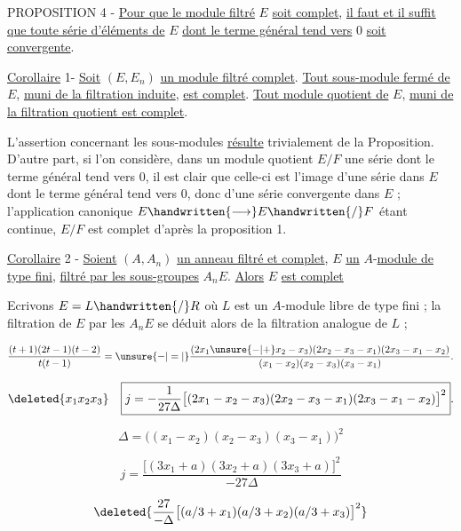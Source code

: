 PROPOSITION 4 - \uline{Pour que le module filtré} $E$ \uline{soit complet}, \uline{il faut et il suffit que toute série d'éléments de} $E$ \uline{dont le terme général tend vers} 0 \uline{soit convergente}.

\uline{Corollaire} 1- \uline{Soit} $(E,E_n)$ \uline{un module filtré complet}. \uline{Tout sous-module fermé de} $E$, \uline{muni de la filtration induite}, \uline{est complet}. \uline{Tout module quotient de} $E$, \uline{muni de la filtration quotient est complet}.

\margin{\handwritten{!}}L'assertion concernant les sous-modules \uline{résulte} trivialement de la Proposition. D'autre part, si l'on considère, dans un module quotient $E/F$ une série dont le terme général tend vers 0, il est clair que celle-ci est l'image d'une série dans $E$ dont le terme général tend vers 0, donc d'une série convergente dans $E$ ; l'application canonique $E\handwritten{\longrightarrow} E\handwritten{/}F$ étant continue, $E/F$ est complet d'après la proposition 1.

\uline{Corollaire} 2 - \uline{Soient} $(A,A_n)$ \uline{un anneau filtré et complet}, $E$ \uline{un} $A$-\uline{module de type fini}, \uline{filtré par les sous-groupes} $A_n E$. \uline{Alors} $E$ \uline{est complet}

Ecrivons $E=L\handwritten{/}R$ où $L$ est un $A$-module libre de type fini ; la filtration de $E$ par les $A_n E$ se déduit alors de la filtration analogue de $L$ ;

\[
\frac{(t+1)(2t-1)(t-2)}{t(t-1)}
=\unsure{-|=|}\frac{(2x_1\unsure{-|+}x_2-x_3)(2x_2-x_3-x_1)(2x_3-x_1-x_2)}
{(x_1-x_2)(x_2-x_3)(x_3-x_1)}.
\]

\[
\deleted{x_1x_2x_3}\quad
\boxed{j=-\frac{1}{27\Delta}\bigl[(2x_1-x_2-x_3)(2x_2-x_3-x_1)(2x_3-x_1-x_2)\bigr]^2}.
\]

\[
\Delta=\bigl((x_1-x_2)(x_2-x_3)(x_3-x_1)\bigr)^2
\]

\[
j=\frac{\bigl[(3x_1+a)(3x_2+a)(3x_3+a)\bigr]^2}{-27\Delta}
\]

\[
\deleted{\frac{27}{-\Delta}\bigl[(a/3+x_1)(a/3+x_2)(a/3+x_3)\bigr]^2}
\]

